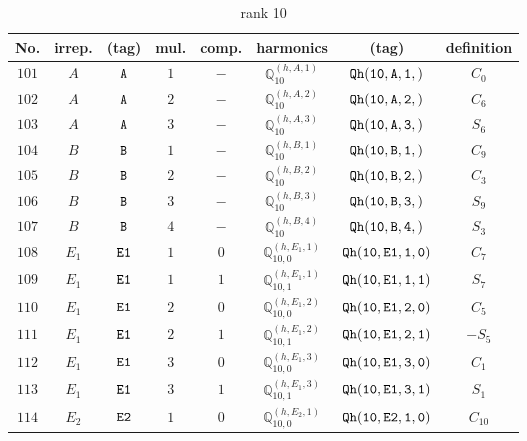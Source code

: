 \documentclass[fleqn,8pt]{jsarticle}
\begin{document}
\begin{table}[ht!]
\begin{center}
\caption{rank 10}
\renewcommand{\arraystretch}{1.3}
\begin{tabular}{cccccccc} \hline \hline
No. & irrep. & (tag) & mul. & comp. & harmonics & (tag) & definition \\ \hline
$ 101 $ & $ A $ & $ {\tt A} $ & $ 1 $ & $ - $ & $ \mathbb{Q}_{10}^{(h,A,1)} $ & $ {\tt Qh(10,A,1,)} $ & $ C_{0} $ \\
$ 102 $ & $ A $ & $ {\tt A} $ & $ 2 $ & $ - $ & $ \mathbb{Q}_{10}^{(h,A,2)} $ & $ {\tt Qh(10,A,2,)} $ & $ C_{6} $ \\
$ 103 $ & $ A $ & $ {\tt A} $ & $ 3 $ & $ - $ & $ \mathbb{Q}_{10}^{(h,A,3)} $ & $ {\tt Qh(10,A,3,)} $ & $ S_{6} $ \\
$ 104 $ & $ B $ & $ {\tt B} $ & $ 1 $ & $ - $ & $ \mathbb{Q}_{10}^{(h,B,1)} $ & $ {\tt Qh(10,B,1,)} $ & $ C_{9} $ \\
$ 105 $ & $ B $ & $ {\tt B} $ & $ 2 $ & $ - $ & $ \mathbb{Q}_{10}^{(h,B,2)} $ & $ {\tt Qh(10,B,2,)} $ & $ C_{3} $ \\
$ 106 $ & $ B $ & $ {\tt B} $ & $ 3 $ & $ - $ & $ \mathbb{Q}_{10}^{(h,B,3)} $ & $ {\tt Qh(10,B,3,)} $ & $ S_{9} $ \\
$ 107 $ & $ B $ & $ {\tt B} $ & $ 4 $ & $ - $ & $ \mathbb{Q}_{10}^{(h,B,4)} $ & $ {\tt Qh(10,B,4,)} $ & $ S_{3} $ \\
$ 108 $ & $ E_{1} $ & $ {\tt E1} $ & $ 1 $ & $ 0 $ & $ \mathbb{Q}_{10,0}^{(h,E_{1},1)} $ & $ {\tt Qh(10,E1,1,0)} $ & $ C_{7} $ \\
$ 109 $ & $ E_{1} $ & $ {\tt E1} $ & $ 1 $ & $ 1 $ & $ \mathbb{Q}_{10,1}^{(h,E_{1},1)} $ & $ {\tt Qh(10,E1,1,1)} $ & $ S_{7} $ \\
$ 110 $ & $ E_{1} $ & $ {\tt E1} $ & $ 2 $ & $ 0 $ & $ \mathbb{Q}_{10,0}^{(h,E_{1},2)} $ & $ {\tt Qh(10,E1,2,0)} $ & $ C_{5} $ \\
$ 111 $ & $ E_{1} $ & $ {\tt E1} $ & $ 2 $ & $ 1 $ & $ \mathbb{Q}_{10,1}^{(h,E_{1},2)} $ & $ {\tt Qh(10,E1,2,1)} $ & $ - S_{5} $ \\
$ 112 $ & $ E_{1} $ & $ {\tt E1} $ & $ 3 $ & $ 0 $ & $ \mathbb{Q}_{10,0}^{(h,E_{1},3)} $ & $ {\tt Qh(10,E1,3,0)} $ & $ C_{1} $ \\
$ 113 $ & $ E_{1} $ & $ {\tt E1} $ & $ 3 $ & $ 1 $ & $ \mathbb{Q}_{10,1}^{(h,E_{1},3)} $ & $ {\tt Qh(10,E1,3,1)} $ & $ S_{1} $ \\
$ 114 $ & $ E_{2} $ & $ {\tt E2} $ & $ 1 $ & $ 0 $ & $ \mathbb{Q}_{10,0}^{(h,E_{2},1)} $ & $ {\tt Qh(10,E2,1,0)} $ & $ C_{10} $ \\

\end{tabular}
\end{center}
\end{table}
\end{document}

